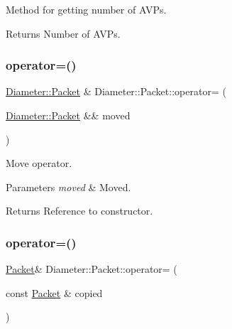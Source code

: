 Method for getting number of A\+V\+Ps. 

\begin{DoxyReturn}{Returns}
Number of A\+V\+Ps. 
\end{DoxyReturn}
\mbox{\label{classDiameter_1_1Packet_a80abbedae208ece043c406a87b8876af}} 
\subsubsection{\texorpdfstring{operator=()}{operator=()}\hspace{0.1cm}{\footnotesize\ttfamily [1/2]}}
{\footnotesize\ttfamily \hyperlink{classDiameter_1_1Packet}{Diameter\+::\+Packet} \& Diameter\+::\+Packet\+::operator= (\begin{DoxyParamCaption}\item[{\hyperlink{classDiameter_1_1Packet}{Diameter\+::\+Packet} \&\&}]{moved }\end{DoxyParamCaption})\hspace{0.3cm}{\ttfamily [noexcept]}}



Move operator. 


\begin{DoxyParams}{Parameters}
{\em moved} & Moved. \\
\hline
\end{DoxyParams}
\begin{DoxyReturn}{Returns}
Reference to constructor. 
\end{DoxyReturn}
\mbox{\label{classDiameter_1_1Packet_aa96abe75677e27722927afb4e22b6800}} 
\subsubsection{\texorpdfstring{operator=()}{operator=()}\hspace{0.1cm}{\footnotesize\ttfamily [2/2]}}
{\footnotesize\ttfamily \hyperlink{classDiameter_1_1Packet}{Packet}\& Diameter\+::\+Packet\+::operator= (\begin{DoxyParamCaption}\item[{const \hyperlink{classDiameter_1_1Packet}{Packet} \&}]{copied }\end{DoxyParamCaption})\hspace{0.3cm}{\ttfamily [default]}}



